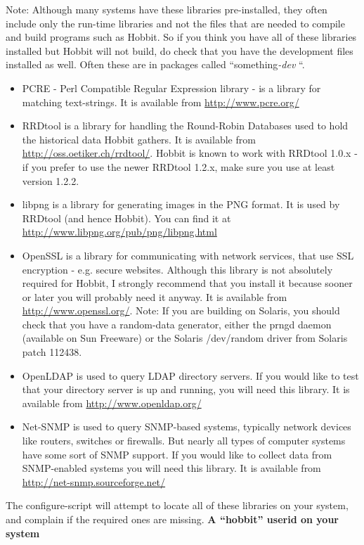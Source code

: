  Note: Although many systems have these libraries pre-installed, they often include only the run-time libraries and not the files that are needed to compile and build programs such as Hobbit. So if you think you have all of these libraries installed but Hobbit will not build, do check that you have the development files installed as well. Often these are in packages called ``something\emph{-dev}
``.
\begin{itemize}
\item PCRE - Perl Compatible Regular Expression library - is a library for matching text-strings. It is available from \url{http://www.pcre.org/}
\item RRDtool is a library for handling the Round-Robin Databases used to hold the historical data Hobbit gathers. It is available from \url{http://oss.oetiker.ch/rrdtool/}. Hobbit is known to work with RRDtool 1.0.x - if you prefer to use the newer RRDtool 1.2.x, make sure you use at least version 1.2.2.
\item libpng is a library for generating images in the PNG format. It is used by RRDtool (and hence Hobbit). You can find it at \url{http://www.libpng.org/pub/png/libpng.html}
\item OpenSSL is a library for communicating with network services, that use SSL encryption - e.g. secure websites. Although this library is not absolutely required for Hobbit, I strongly recommend that you install it because sooner or later you will probably need it anyway. It is available from \url{http://www.openssl.org/}. Note: If you are building on Solaris, you should check that you have a random-data generator, either the prngd daemon (available on Sun Freeware) or the Solaris /dev/random driver from Solaris patch 112438.
\item OpenLDAP is used to query LDAP directory servers. If you would like to test that your directory server is up and running, you will need this library. It is available from \url{http://www.openldap.org/}
\item Net-SNMP is used to query SNMP-based systems, typically network devices like routers, switches or firewalls. But nearly all types of computer systems have some sort of SNMP support. If you would like to collect data from SNMP-enabled systems you will need this library. It is available from \url{http://net-snmp.sourceforge.net/}

\end{itemize}


 The configure-script will attempt to locate all of these libraries on your system, and complain if the required ones are missing.
\textbf{A ``hobbit'' userid on your system}


